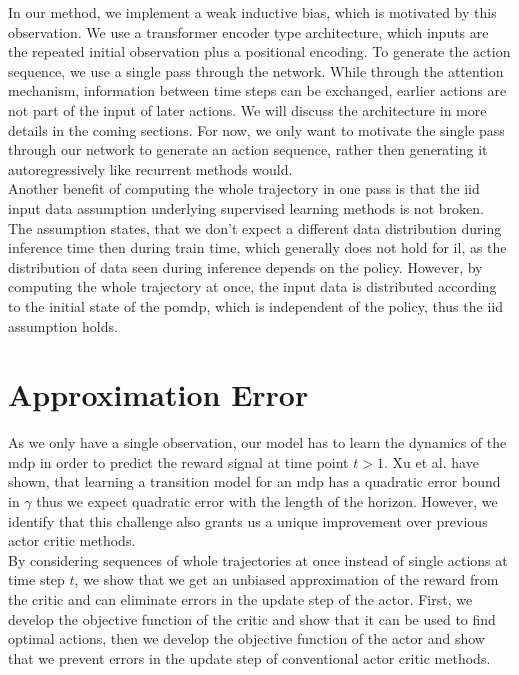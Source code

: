 In our method, we implement a weak inductive bias, which is motivated by this observation. We use a transformer encoder type architecture, which inputs are 
the repeated initial observation plus a positional encoding. To generate the action sequence, we use a single pass through the network. While through the attention mechanism, 
information between time steps can be exchanged, earlier actions are not part of the input of later actions. 
We will discuss the architecture in more details in the coming sections. For now, we only want to motivate the single pass through 
our network to generate an action sequence, rather then generating it autoregressively like recurrent methods would.\\ 

Another benefit of computing the whole trajectory in one pass is that the \ac{iid} input data 
assumption underlying supervised learning methods is not broken. The assumption states, that we don't expect a different data distribution during inference time 
then during train time, which generally does not hold for \ac{il}, as the distribution of data seen during inference depends on the policy. 
However, by computing the whole trajectory at once, the input data is distributed according to the initial state of the \ac{pomdp}, which is independent of 
the policy, thus the \ac{iid} assumption holds.\\

\section{Approximation Error}
\label{inference_time_planning}
As we only have a single observation, our model has to learn the dynamics of the \ac{mdp} in order to predict the reward signal at time point $t > 1$. Xu et al. \cite{NEURIPS2020_b5c01503} 
have shown, that learning a transition model for an \ac{mdp} has a quadratic error bound in $\gamma$ thus we expect quadratic error with the length of the horizon. 
However, we identify that this challenge also grants us a unique improvement over previous actor critic methods.\\ 

By considering sequences of whole trajectories at once instead of single actions 
at time step $t$, 
we show that we get an unbiased approximation of the reward from the critic and can eliminate errors in the update step of the actor. First, we develop the objective function of the critic and 
show that it can be used to find optimal actions, then we develop the objective function of the actor and show that we prevent errors in the update step of conventional actor critic methods.\\

